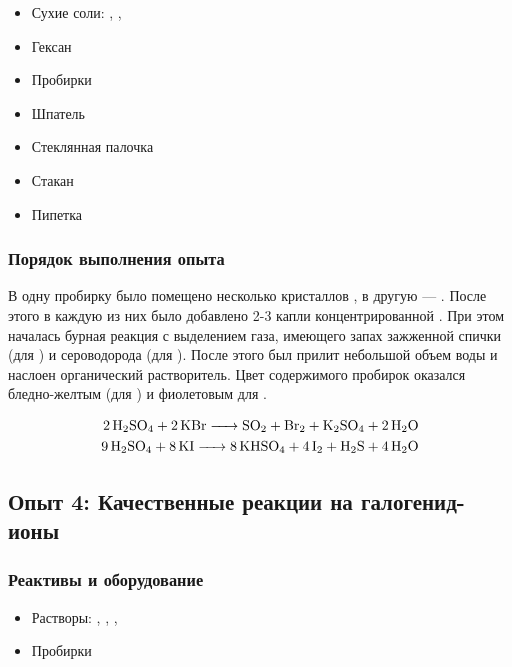 \documentclass[a4paper, 12pt]{article}
\begin{document}
\begin{itemize}
	\item Сухие соли: , , 
	
	\item Гексан
	
	\item Пробирки
	
	\item Шпатель
	
	\item Стеклянная палочка
	
	\item Стакан
	
	\item Пипетка
\end{itemize}

\subsubsection{Порядок выполнения опыта}

В одну пробирку было помещено несколько кристаллов , в другую --- . После этого в каждую из них было добавлено 2-3 капли концентрированной . При этом началась бурная реакция с выделением газа, имеющего запах зажженной спички (для ) и сероводорода (для ). После этого был прилит небольшой объем воды и наслоен органический растворитель. Цвет содержимого пробирок оказался бледно-желтым (для ) и фиолетовым для .

\begin{align}
	\ce{2H2SO4 + 2 KBr -> SO2 + Br2 + K2SO4 + 2H2O}\\
	\ce{9H2SO4 + 8 KI -> 8KHSO4 + 4 I2 + H2S + 4H2O}
\end{align}


\subsection{Опыт 4: Качественные реакции на галогенид-ионы}

\subsubsection{Реактивы и оборудование}

\begin{itemize}
	\item Растворы: , , , 
	
	\item Пробирки
\end{itemize}
\end{document}
